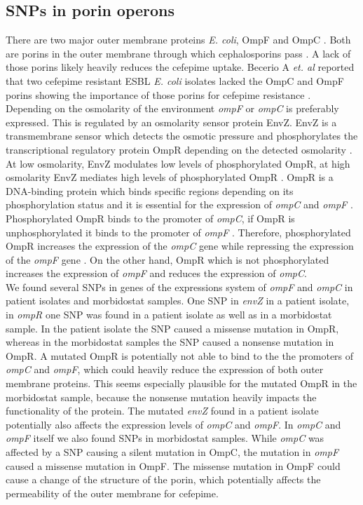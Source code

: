 \subsection{SNPs in porin operons}
There are two major outer membrane proteins \textit{E. coli}, OmpF and OmpC \cite{rampersaud_ompr_1994}. Both are porins in the outer membrane through which cephalosporins pass \cite{masi_structure_2013}. A lack of those porins likely heavily reduces the cefepime uptake. Becerio A \textit{et. al} reported that two cefepime resistant ESBL \textit{E. coli} isolates lacked the OmpC and OmpF porins showing the importance of those porins for cefepime resistance \cite{beceiro_false_2011}.  Depending on the osmolarity of the environment \textit{ompF} or \textit{ompC} is preferably expressed. This is regulated by an osmolarity sensor protein EnvZ. EnvZ is a transmembrane sensor which detects the osmotic pressure and phosphorylates the transcriptional regulatory protein OmpR depending on the detected osmolarity \cite{rampersaud_ompr_1994}. At low osmolarity, EnvZ modulates low levels of phosphorylated OmpR, at high osmolarity EnvZ mediates high levels of phosphorylated OmpR \cite{rampersaud_ompr_1994}. OmpR is a DNA-binding protein which binds specific regions depending on its phosphorylation status and it is essential for the expression of \textit{ompC} and \textit{ompF} \cite{rampersaud_ompr_1994}. Phosphorylated OmpR binds to the promoter of \textit{ompC}, if OmpR is unphosphorylated it binds to the promoter of \textit{ompF} \cite{rampersaud_ompr_1994}. Therefore, phosphorylated OmpR increases the expression of the \textit{ompC} gene while repressing the expression of the \textit{ompF} gene \cite{rampersaud_ompr_1994}. On the other hand, OmpR which is not phosphorylated increases the expression of \textit{ompF} and reduces the expression of \textit{ompC}. \\
We found several SNPs in genes of the expressions system of \textit{ompF} and \textit{ompC} in patient isolates and morbidostat samples. One SNP in \textit{envZ} in a patient isolate, in \textit{ompR} one SNP was found in a patient isolate as well as in a morbidostat sample. In the patient isolate the SNP caused a missense mutation in OmpR, whereas in the morbidostat samples the SNP caused a nonsense mutation in OmpR. A mutated OmpR is potentially not able to bind to the the promoters of \textit{ompC} and \textit{ompF}, which could heavily reduce the expression of both outer membrane proteins. This seems especially plausible for the mutated OmpR in the morbidostat sample, because the nonsense mutation heavily impacts the functionality of the protein. The mutated \textit{envZ} found in a patient isolate potentially also affects the expression levels of \textit{ompC} and \textit{ompF}. In \textit{ompC} and \textit{ompF} itself we also found SNPs in morbidostat samples. While \textit{ompC} was affected by a SNP causing a silent mutation in OmpC, the mutation in \textit{ompF} caused a missense mutation in OmpF. The missense mutation in OmpF could cause a change of the structure of the porin, which potentially affects the permeability of the outer membrane for cefepime.\\
